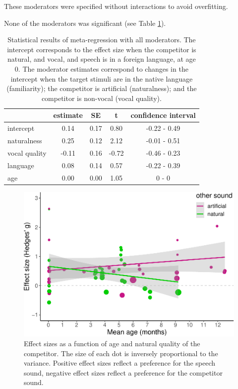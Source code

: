 \documentclass[
  english,
  man]{apa6}
\begin{document}
These moderators were specified without interactions to avoid overfitting.

None of the moderators was significant (see Table \ref{tab:Table2}).

\begin{table}[tbp]

\begin{center}
\begin{threeparttable}

\caption{\label{tab:Table2}Statistical results of meta-regression with all moderators. The intercept corresponds to the effect size when the competitor is natural, and vocal, and speech is in a foreign language, at age 0. The moderator estimates correspond to changes in the intercept when the target stimuli are in the native language (familiarity); the competitor is artificial (naturalness); and the competitor is non-vocal (vocal quality).}

\begin{tabular}{lcccc}
\toprule
 & estimate & SE & t & confidence interval\\
\midrule
intercept & 0.14 & 0.17 & 0.80 & -0.22 - 0.49\\
naturalness & 0.25 & 0.12 & 2.12 & -0.01 - 0.51\\
vocal quality & -0.11 & 0.16 & -0.72 & -0.46 - 0.23\\
language & 0.08 & 0.14 & 0.57 & -0.22 - 0.39\\
age & 0.00 & 0.00 & 1.05 & 0 - 0\\
\bottomrule
\end{tabular}

\end{threeparttable}
\end{center}

\end{table}

\begin{figure}
\centering
\includegraphics{MA_speech_pref_files/figure-latex/natural-1.pdf}
\caption{\label{fig:natural}Effect sizes as a function of age and natural quality of the competitor. The size of each dot is inversely proportional to the variance. Positive effect sizes reflect a preference for the speech sound, negative effect sizes reflect a preference for the competitor sound.}
\end{figure}
\end{document}
